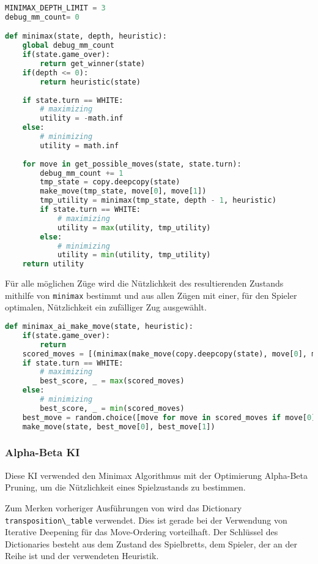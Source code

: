 \begin{lstlisting}[language=Python]
MINIMAX_DEPTH_LIMIT = 3
debug_mm_count= 0

def minimax(state, depth, heuristic):
    global debug_mm_count
    if(state.game_over):
        return get_winner(state)
    if(depth <= 0):
        return heuristic(state)
    
    if state.turn == WHITE:
        # maximizing
        utility = -math.inf
    else:
        # minimizing
        utility = math.inf
        
    for move in get_possible_moves(state, state.turn):
        debug_mm_count += 1
        tmp_state = copy.deepcopy(state)
        make_move(tmp_state, move[0], move[1])
        tmp_utility = minimax(tmp_state, depth - 1, heuristic)
        if state.turn == WHITE:
            # maximizing
            utility = max(utility, tmp_utility)
        else:
            # minimizing
            utility = min(utility, tmp_utility)          
    return utility
\end{lstlisting}

Für alle möglichen Züge wird die Nützlichkeit des resultierenden
Zustands mithilfe von \passthrough{\lstinline!minimax!} bestimmt und aus
allen Zügen mit einer, für den Spieler optimalen, Nützlichkeit ein
zufälliger Zug ausgewählt.

\begin{lstlisting}[language=Python]
def minimax_ai_make_move(state, heuristic):
    if(state.game_over):
        return
    scored_moves = [(minimax(make_move(copy.deepcopy(state), move[0], move[1]), MINIMAX_DEPTH_LIMIT-1, heuristic), move) for move in state.possible_moves]
    if state.turn == WHITE:
        # maximizing
        best_score, _ = max(scored_moves)
    else:
        # minimizing
        best_score, _ = min(scored_moves)
    best_move = random.choice([move for move in scored_moves if move[0] == best_score])[1]
    make_move(state, best_move[0], best_move[1])
\end{lstlisting}

\hypertarget{alpha-beta-ki}{%
\subsubsection{Alpha-Beta KI}\label{alpha-beta-ki}}

Diese KI verwended den Minimax Algorithmus mit der Optimierung
Alpha-Beta Pruning, um die Nützlichkeit eines Spielzustands zu
bestimmen.

Zum Merken vorheriger Ausführungen von wird das Dictionary
\passthrough{\lstinline!transposition\_table!} verwendet. Dies ist
gerade bei der Verwendung von Iterative Deepening für das Move-Ordering
vorteilhaft. Der Schlüssel des Dictionaries besteht aus dem Zustand des
Spielbretts, dem Spieler, der an der Reihe ist und der verwendeten
Heuristik.

